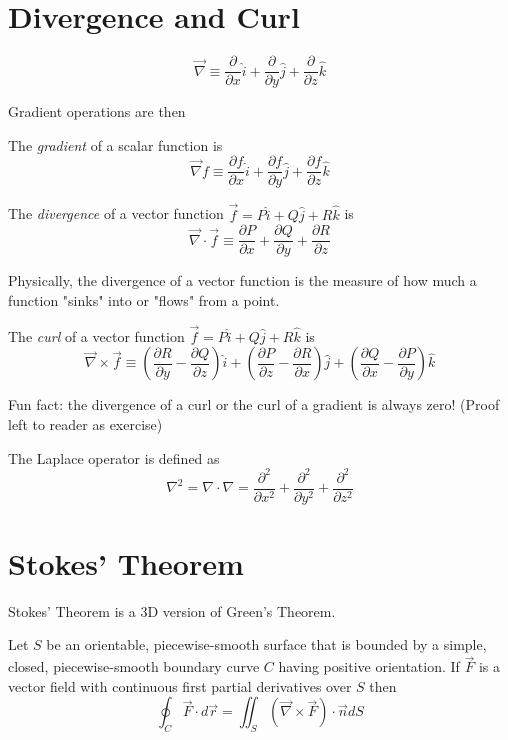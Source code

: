 \documentclass[12pt]{article}
\begin{document}
\section{Divergence and Curl}

\begin{defn}
	$$\vec{\nabla} \equiv \frac{\partial}{\partial x}\hat{i} + \frac{\partial}{\partial y}\hat{j} + \frac{\partial}{\partial z}\hat{k}$$
\end{defn}

Gradient operations are then

\begin{defn}
The \emph{gradient} of a scalar function is
	$$\vec{\nabla}f \equiv \frac{\partial f}{\partial x}\hat{i} + \frac{\partial f}{\partial y}\hat{j} + \frac{\partial f}{\partial z}\hat{k}$$
\end{defn}

\begin{defn}
	The \emph{divergence} of a vector function $\vec{f} = P\hat{i} + Q\hat{j} + R\hat{k}$ is
	$$\vec{\nabla}\cdot \vec{f} \equiv \frac{\partial P}{\partial x} + \frac{\partial Q}{\partial y} + \frac{\partial R}{\partial z}$$
\end{defn}

Physically, the divergence of a vector function is the measure of how much a function "sinks" into or "flows" from a point.

\begin{defn}
	The \emph{curl} of a vector function $\vec{f} = P\hat{i} + Q\hat{j} + R\hat{k}$ is
	$$\vec{\nabla}\times \vec{f} \equiv \left(\frac{\partial R}{\partial y} - \frac{\partial Q}{\partial z}\right)\hat{i} + \left(\frac{\partial P}{\partial z} - \frac{\partial R}{\partial x}\right)\hat{j} + \left(\frac{\partial Q}{\partial x} - \frac{\partial P}{\partial y}\right)\hat{k}$$
\end{defn}

Fun fact: the divergence of a curl or the curl of a gradient is always zero! (Proof left to reader as exercise)

\begin{defn}
	The Laplace operator is defined as
	$$\nabla^2 = \nabla\cdot\nabla = \frac{\partial^2}{\partial x^2} + \frac{\partial^2}{\partial y^2} + \frac{\partial^2}{\partial z^2}$$
\end{defn}

\section{Stokes' Theorem}
Stokes' Theorem is a 3D version of Green's Theorem.
\begin{thm}
	Let $S$ be an orientable, piecewise-smooth surface that is bounded by a simple, closed, piecewise-smooth boundary curve $C$ having positive orientation. If $\vec{F}$ is a vector field with continuous first partial derivatives over $S$ then
	$$\oint_C \vec{F}\cdot d\vec{r} = \iint_S\left(\vec{\nabla}\times\vec{F}\right)\cdot\vec{n}dS$$
\end{thm}
\end{document}
